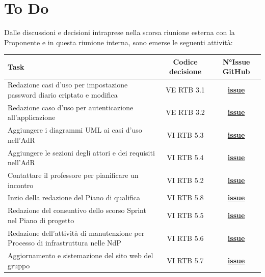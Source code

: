 \documentclass[a4paper,12pt]{article}
\newcommand{\ignoreglossary}{}
\begin{document}
\section{To Do}
Dalle discussioni e decisioni intraprese nella scorsa riunione esterna con la Proponente e in questa riunione interna, sono emerse le seguenti attività:

\begin{center}
\small
\renewcommand{\arraystretch}{1.2} 
\begin{tabular}{|p{}|c|c|}
\hline
\rowcolor{gray!60} 
\textbf{Task} & \textbf{Codice decisione} & \textbf{N°Issue GitHub} \\
\hline
\rowcolor{white}
Redazione casi d'uso per impostazione password diario criptato e modifica & VE \ignoreglossary{RTB} 3.1 & \href{https://github.com/SWE-BitByBit/SWE-docs/issues/216}{\textbf{issue}} \\
\hline
\rowcolor{gray!20}
Redazione caso d'uso per autenticazione all'applicazione & VE \ignoreglossary{RTB} 3.2 & \href{https://github.com/SWE-BitByBit/SWE-docs/issues/213}{\textbf{issue}} \\
\hline
\rowcolor{white}
Aggiungere i diagrammi UML ai casi d'uso nell'AdR & VI \ignoreglossary{RTB} 5.3 & \href{https://github.com/SWE-BitByBit/SWE-docs/issues/204}{\textbf{issue}} \\
\hline
\rowcolor{gray!20}
Aggiungere le sezioni degli attori e dei requisiti nell'AdR & VI \ignoreglossary{RTB} 5.4 & \href{https://github.com/SWE-BitByBit/SWE-docs/issues/206}{\textbf{issue}} \\
\hline
\rowcolor{white}
Contattare il professore per pianificare un incontro & VI \ignoreglossary{RTB} 5.2 & \href{https://github.com/SWE-BitByBit/SWE-docs/issues/208}{\textbf{issue}} \\
\hline
\rowcolor{gray!20}
Inzio della redazione del Piano di qualifica & VI \ignoreglossary{RTB} 5.8 & \href{https://github.com/SWE-BitByBit/SWE-docs/issues/210}{\textbf{issue}} \\
\hline
\rowcolor{white}
Redazione del consuntivo dello scorso Sprint nel Piano di progetto & VI \ignoreglossary{RTB} 5.5 & \href{https://github.com/SWE-BitByBit/SWE-docs/issues/207}{\textbf{issue}} \\
\hline
\rowcolor{gray!20}
Redazione dell'attività di manutenzione per Processo di infrastruttura nelle NdP & VI \ignoreglossary{RTB} 5.6 & \href{https://github.com/SWE-BitByBit/SWE-docs/issues/211}{\textbf{issue}} \\
\hline
\rowcolor{white}
Aggiornamento e sistemazione del sito web del gruppo & VI \ignoreglossary{RTB} 5.7 & \href{https://github.com/SWE-BitByBit/SWE-docs/issues/212}{\textbf{issue}} \\
\hline

\end{tabular}
\end{center}
\end{document}
